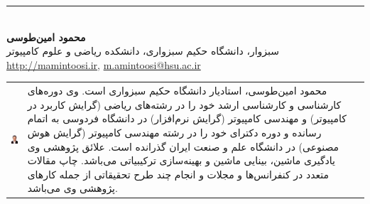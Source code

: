 \documentclass[11pt, twoside]{imsproc}
\begin{document}
{\small
\setlength{\itemsep}{-.5ex}


}

\noindent \rule{.4\linewidth}{0.8pt}\\
\noindent\footnotesize{\bfseries محمود امین‌طوسی } \\
\footnotesize{سبزوار، دانشگاه حکیم سبزواری، دانشکده ریاضی و علوم کامپیوتر }\\
\url{http://mamintoosi.ir},
\url{m.amintoosi@hsu.ac.ir}\\
\begin{tabular}{p{2 cm} p{14 cm} }
\includegraphics[width=18mm]{mAmintoosi1397.jpg}
&\vspace{-2.4cm}
\footnotesize
محمود امین‌طوسی، استادیار دانشگاه حکیم سبزواری است. وی دوره‌های کارشناسی و کارشناسی ارشد خود را در رشته‌های ریاضی (گرایش کاربرد در کامپیوتر) و  مهندسی کامپیوتر (گرایش نرم‌افزار) در  دانشگاه فردوسی به اتمام رسانده و دوره دکترای خود را در رشته مهندسی کامپیوتر (گرایش هوش مصنوعی) در دانشگاه علم و صنعت ایران گذرانده است.
علائق پژوهشی وی یادگیری ماشین، بینایی ماشین و بهینه‌سازی ترکیبیاتی می‌باشد. چاپ مقالات متعدد در کنفرانس‌ها و مجلات و انجام چند طرح تحقیقاتی از جمله کارهای پژوهشی وی می‌باشد.\\
\end{tabular}
\end{document}
